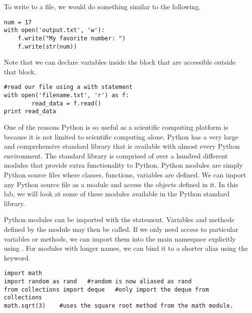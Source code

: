 To write to a file, we would do something similar to the following.
\begin{lstlisting}
num = 17
with open('output.txt', 'w'):
    f.write("My favorite number: ")
    f.write(str(num))
\end{lstlisting}

Note that we can declare variables inside the  block that are accessible outside that block.
\begin{lstlisting}
#read our file using a with statement
with open('filename.txt', 'r') as f:
        read_data = f.read()
print read_data
\end{lstlisting}

One of the reasons Python is so useful as a scientific computing platform is because it is not limited to scientific computing alone.
Python has a very large and comprehensive standard library that is available with almost every Python environment.
The standard library is comprised of over a hundred different modules that provide extra functionality to Python.
Python modules are simply Python source files where classes, functions, variables are defined.
We can import any Python source file as a module and access the objects defined in it.
In this lab, we will look at some of these modules available in the Python standard library.

Python modules can be imported with the  statement. 
Variables and methods defined by the module may then be called.
If we only need access to particular variables or methods, we can import them into the main namespace explicitly using .
For modules with longer names, we can bind it to a shorter alias using the  keyword.
\begin{lstlisting}
import math
import random as rand   #random is now aliased as rand
from collections import deque   #only import the deque from collections
math.sqrt(3)    #uses the square root method from the math module.\end{lstlisting}

